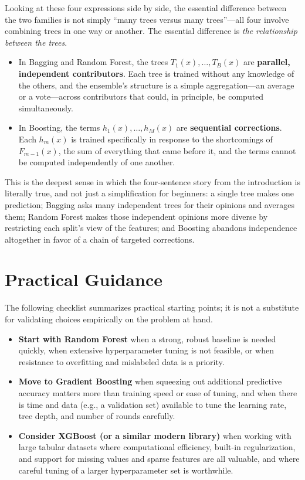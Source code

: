 \documentclass[12pt,a4paper]{article}
\begin{document}
Looking at these four expressions side by side, the essential difference between the two families is not simply ``many trees versus many trees''---all four involve combining trees in one way or another. The essential difference is \emph{the relationship between the trees}.

\begin{itemize}[nosep]
    \item In Bagging and Random Forest, the trees $T_1(x), \ldots, T_B(x)$ are \textbf{parallel, independent contributors}. Each tree is trained without any knowledge of the others, and the ensemble's structure is a simple aggregation---an average or a vote---across contributors that could, in principle, be computed simultaneously.
    \item In Boosting, the terms $h_1(x), \ldots, h_M(x)$ are \textbf{sequential corrections}. Each $h_m(x)$ is trained specifically in response to the shortcomings of $F_{m-1}(x)$, the sum of everything that came before it, and the terms cannot be computed independently of one another.
\end{itemize}

This is the deepest sense in which the four-sentence story from the introduction is literally true, and not just a simplification for beginners: a single tree makes one prediction; Bagging asks many independent trees for their opinions and averages them; Random Forest makes those independent opinions more diverse by restricting each split's view of the features; and Boosting abandons independence altogether in favor of a chain of targeted corrections.

\section{Practical Guidance}

The following checklist summarizes practical starting points; it is not a substitute for validating choices empirically on the problem at hand.

\begin{itemize}[nosep]
    \item \textbf{Start with Random Forest} when a strong, robust baseline is needed quickly, when extensive hyperparameter tuning is not feasible, or when resistance to overfitting and mislabeled data is a priority.
    \item \textbf{Move to Gradient Boosting} when squeezing out additional predictive accuracy matters more than training speed or ease of tuning, and when there is time and data (e.g., a validation set) available to tune the learning rate, tree depth, and number of rounds carefully.
    \item \textbf{Consider XGBoost (or a similar modern library)} when working with large tabular datasets where computational efficiency, built-in regularization, and support for missing values and sparse features are all valuable, and where careful tuning of a larger hyperparameter set is worthwhile.
\end{itemize}
\end{document}
